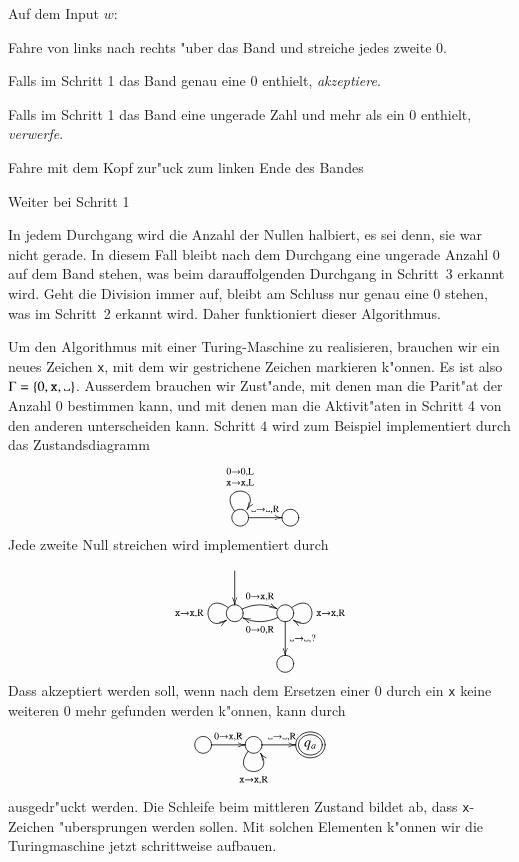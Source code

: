Auf dem Input $w$:
\begin{compactenum}
\item Fahre von links nach rechts "uber das Band und streiche jedes zweite $0$.
\item Falls im Schritt 1 das Band genau eine $0$ enthielt, {\it akzeptiere}.
\item Falls im Schritt 1 das Band eine ungerade Zahl und mehr als ein $0$
enthielt, {\it verwerfe}.
\item Fahre mit dem Kopf zur"uck zum linken Ende des Bandes
\item Weiter bei Schritt 1
\end{compactenum}
In jedem Durchgang wird die Anzahl der Nullen halbiert, es sei denn,
sie war nicht gerade. In diesem Fall bleibt nach dem Durchgang eine
ungerade Anzahl $0$ auf dem Band stehen, was beim darauffolgenden Durchgang
in Schritt~3 erkannt wird. Geht die Division immer auf, bleibt am Schluss
nur genau eine $0$ stehen, was im Schritt~2 erkannt wird. Daher funktioniert
dieser Algorithmus.

Um den Algorithmus mit einer Turing-Maschine zu realisieren, brauchen wir
ein neues Zeichen {\tt x}, mit dem wir gestrichene Zeichen markieren
k"onnen. Es ist also $\Gamma = \{0,{\tt x},\blank\}$.
Ausserdem brauchen wir
Zust"ande, mit denen man die Parit"at der Anzahl $0$ bestimmen kann, und
mit denen man die Aktivit"aten in Schritt 4 von den anderen unterscheiden
kann. Schritt $4$ wird zum Beispiel implementiert durch das
Zustandsdiagramm
\[
\entrymodifiers={++[o][F]}
\xymatrix{
{}\ar@(ul,ur)^{\genfrac{}{}{0pt}{1}{0\to 0,\text{L}}{{\tt x}\to{\tt x},\text{L}}}
\ar[r]^{\blank\to\blank,\text{R}}
	&
}
\]
Jede zweite Null streichen wird implementiert durch
\[
\entrymodifiers={++[o][F]}
\xymatrix{
*+\txt{}\ar[d]
\\
\ar@/^/[r]^{0\to{\tt x},\text{R}}
\ar@(ul,dl)_{\tt x\to\tt x,\text{R}}
	&\ar@/^/[l]^{0\to 0,\text{R}}
         \ar@(ur,dr)^{\tt x\to\tt x,\text{R}}
	 \ar[d]^{\blank\to\blank,?}
\\
*+\txt{}
	&{}
}
\]
Dass akzeptiert werden soll, wenn nach dem Ersetzen einer $0$ durch
ein {\tt x} keine weiteren $0$ mehr gefunden werden k"onnen, kann durch
\[
\entrymodifiers={++[o][F]}
\xymatrix{
\ar[r]^{0\to{\tt x},\text{R}}
	&{} \ar@(dl,dr)_{{\tt x}\to{\tt x},\text{R}}
	    \ar[r]^{\blank\to\blank,\text{R}}
		&*++[o][F=]{q_a}
}
\]
ausgedr"uckt werden. Die Schleife beim mittleren Zustand
bildet ab, dass {\tt x}-Zeichen "ubersprungen werden sollen.
Mit solchen Elementen k"onnen wir die Turingmaschine jetzt schrittweise
aufbauen.

